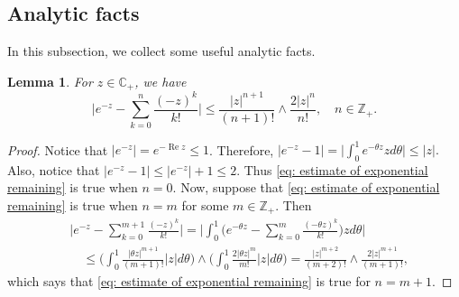 \documentclass[12pt,a4paper]{amsart}
\theoremstyle{plain}
\newtheorem{lem}[thm]{Lemma}
\theoremstyle{definition}
\numberwithin{equation}{section}
\begin{document}
\subsection{Analytic facts}
In this subsection, we collect some useful analytic facts.
\begin{lem}
  \label{lem: estimate of exponential remaining}
  For $z\in \mathbb C_+$,  we have
  \begin{equation}
    \label{eq: estimate of exponential remaining}
    \Big|e^{-z} - \sum_{k=0}^n \frac{(-z)^k}{k!} \Big|
    \leq \frac{|z|^{n+1}}{(n+1)!} \wedge \frac{2|z|^{n}}{n!}, \quad n\in \mathbb Z_+.
  \end{equation}
\end{lem}
\begin{proof}
  Notice that $|e^{-z}| = e^{- \operatorname{Re} z} \leq 1$.
  Therefore,
$
|e^{-z} - 1|
  = \Big| \int_0^1 e^{-\theta z} z d\theta\Big|
  \leq |z|.
$
Also, notice that $|e^{-z} - 1| \leq |e^{-z}|+1 \leq 2$.
Thus \eqref{eq: estimate of exponential remaining} is true when $n = 0$.
Now, suppose that \eqref{eq: estimate of exponential remaining} is true when $n = m$ for some $m \in \mathbb Z_+$.
Then
\begin{align}
  &\Big|e^{-z} - \sum_{k=0}^{m+1} \frac{(-z)^k}{k!}\Big|
    = \Big| \int_0^1\Big(e^{-\theta z} - \sum_{k=0}^m \frac{(-\theta z)^k}{k!} \Big) z d\theta \Big| \\
  & \quad \leq  \Big(\int_0^1 \frac{|\theta z|^{m+1}}{(m+1)!} |z| d\theta\Big) \wedge \Big(\int_0^1 \frac{2|\theta z|^{m}}{m!} |z| d\theta\Big)
    = \frac{|z|^{m+2}}{(m+2)!} \wedge \frac{2|z|^{m+1}}{(m+1)!},
\end{align}
which says that \eqref{eq: estimate of exponential remaining} is true for $n = m + 1$.
\end{proof}
\end{document}
